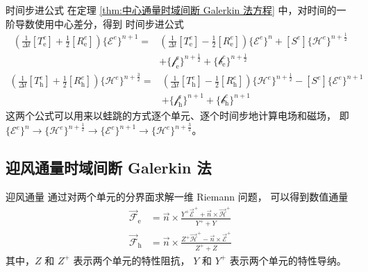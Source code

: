 \begin{theorem}{时间步进公式}
    在定理 \ref{thm:中心通量时域间断 Galerkin 法方程} 中，对时间的一阶导数使用中心差分，得到
    时间步进公式
    \begin{equation}
        \begin{aligned}
            \left(
                \frac{1}{\Delta t}[T^e_{\text{e}}]
                +\frac{1}{2}[R^e_{\text{e}}]
            \right)\{\mathscr{E}^e\}^{n+1}
            =&\left(
                \frac{1}{\Delta t}[T^e_{\text{e}}]
                -\frac{1}{2}[R^e_{\text{e}}]
            \right)\{\mathscr{E}^e\}^{n}
            +[S^e]\{\mathscr{H}^e\}^{n+\frac{1}{2}}\\
            &+\{\mathscr{f}^e_{\text{e}}\}^{n+\frac{1}{2}}
            +\{\mathscr{b}^e_{\text{e}}\}^{n+\frac{1}{2}}
        \end{aligned}
    \end{equation}
    \begin{equation}
        \begin{aligned}
            \left(
                \frac{1}{\Delta t}[T^e_{\text{h}}]
                +\frac{1}{2}[R^e_{\text{h}}]
            \right)\{\mathscr{H}^e\}^{n+\frac{3}{2}}
            =&\left(
                \frac{1}{\Delta t}[T^e_{\text{h}}]
                -\frac{1}{2}[R^e_{\text{h}}]
            \right)\{\mathscr{H}^e\}^{n+\frac{1}{2}}
            -[S^e]\{\mathscr{E}^e\}^{n+1}\\
            &+\{\mathscr{f}^e_{\text{h}}\}^{n+1}
            +\{\mathscr{b}^e_{\text{h}}\}^{n+1}
        \end{aligned}
    \end{equation}
    这两个公式可以用来以蛙跳的方式逐个单元、逐个时间步地计算电场和磁场，
    即 $\{\mathscr{E}^e\}^{n}
    \rightarrow \{\mathscr{H}^e\}^{n+\frac{1}{2}}
    \rightarrow \{\mathscr{E}^e\}^{n+1}
    \rightarrow \{\mathscr{H}^e\}^{n+\frac{3}{2}}$。
\end{theorem}

\subsection{迎风通量时域间断 Galerkin 法}

\begin{theorem}{迎风通量}
    通过对两个单元的分界面求解一维 Riemann 问题，
    可以得到数值通量
    \begin{align}
        \vec{\mathscr{F}}_{\text{e}}&=
        \vec{n}\times\frac{Y^+\vec{\mathscr{E}}^+ +\vec{n}\times\vec{\mathscr{H}}^+}
        {Y^+ + Y}\\
        \vec{\mathscr{F}}_{\text{h}}&=
        \vec{n}\times\frac{Z^+\vec{\mathscr{H}}^+ -\vec{n}\times\vec{\mathscr{E}}^+}
        {Z^+ + Z}
    \end{align}
    其中，$Z$ 和 $Z^+$ 表示两个单元的特性阻抗，
    $Y$ 和 $Y^+$ 表示两个单元的特性导纳。
\end{theorem}

